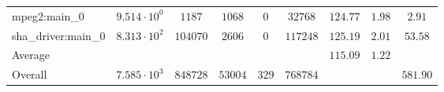 \begin{tabular}{|l|c|c|c|c|c|c|c|c|}
mpeg2:main\_0           & $ 9.514 \cdot 10^{0} $ & $ 1187   $ & $ 1068  $ & $ 0   $ & $ 32768  $ & $ 124.77      $ & $ 1.98    $ & $ 2.91    $ \\
sha\_driver:main\_0     & $ 8.313 \cdot 10^{2} $ & $ 104070 $ & $ 2606  $ & $ 0   $ & $ 117248 $ & $ 125.19      $ & $ 2.01    $ & $ 53.58   $ \\
\hline
Average                 & $                    $ & $        $ & $       $ & $     $ & $        $ & $ 115.09      $ & $ 1.22    $ & $         $ \\
\hline
Overall                 & $ 7.585 \cdot 10^{3} $ & $ 848728 $ & $ 53004 $ & $ 329 $ & $ 768784 $ & $             $ & $         $ & $ 581.90  $ \\
\hline
\end{tabular}
